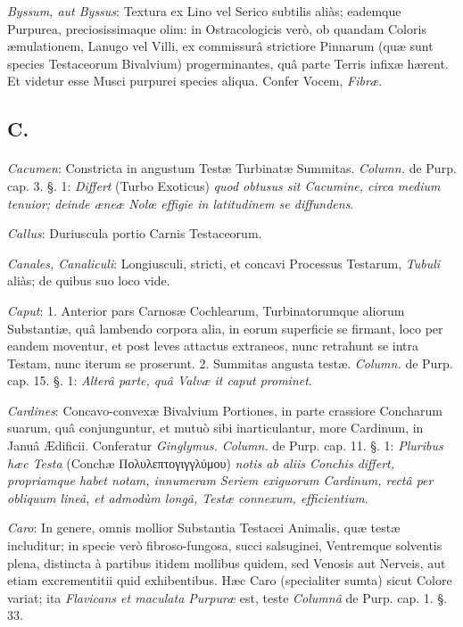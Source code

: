 \documentclass[a4paper, 11pt, oneside, polutonikogreek, german]{article}
\begin{document}
\emph{Byssum, aut Byssus}: Textura ex Lino vel Serico subtilis aliàs; eademque Purpurea, preciosissimaque olim: in Ostracologicis verò, ob quandam Coloris æmulationem, Lanugo vel Villi, ex commissurâ strictiore Pinnarum (quæ sunt species Testaceorum Bivalvium) progerminantes, quâ parte Terris infixæ hærent. Et videtur esse Musci purpurei species aliqua. Confer Vocem, \emph{Fibræ}.

\subsection{C.}
\paragraph{}
\emph{Cacumen}: Constricta in angustum Testæ Turbinatæ Summitas. \emph{Column.} de Purp. cap. 3. §. 1: \emph{Differt} (Turbo Exoticus) \emph{quod obtusus sit Cacumine, circa medium tenuior; deinde æneæ Nolœ effigie in latitudinem se diffundens}.

\emph{Callus}: Duriuscula portio Carnis Testaceorum.

\emph{Canales, Canaliculi}: Longiusculi, stricti, et concavi Processus Testarum, \emph{Tubuli} aliàs; de quibus suo loco vide.

\emph{Caput}: 1. Anterior pars Carnosæ Cochlearum, Turbinatorumque aliorum Substantiæ, quâ lambendo corpora alia, in eorum superficie se firmant, loco per eandem moventur, et post leves attactus extraneos, nunc retrahunt se intra Testam, nunc iterum se proserunt. 2. Summitas angusta testæ. \emph{Column.} de Purp. cap. 15. §. 1: \emph{Alterâ parte, quâ Valvæ it caput prominet}.

\emph{Cardines}: Concavo-convexæ Bivalvium Portiones, in parte crassiore Concharum suarum, quâ conjunguntur, et mutuò sibi inarticulantur, more Cardinum, in Januâ Ædificii. Conferatur \emph{Ginglymus. Column.} de Purp. cap. 11. §. 1: \emph{Pluribus hæc Testa} (Conchæ Πολυλεπτογιγγλύμου) \emph{notis ab aliis Conchis differt, propriamque habet notam, innumeram Seriem exiguorum Cardinum, rectâ per obliquum lineâ, et admodùm longâ, Testæ connexum, efficientium}.

\emph{Caro}: In genere, omnis mollior Substantia Testacei Animalis, quæ testæ includitur; in specie verò fibroso-fungosa, succi salsuginei, Ventremque solventis plena, distincta à partibus itidem mollibus quidem, sed Venosis aut Nerveis, aut etiam excrementitii quid exhibentibus. Hæc Caro (specialiter sumta) sicut Colore variat; ita \emph{Flavicans et maculata Purpuræ} est, teste \emph{Columnâ} de Purp. cap. 1. §. 33.
\end{document}
